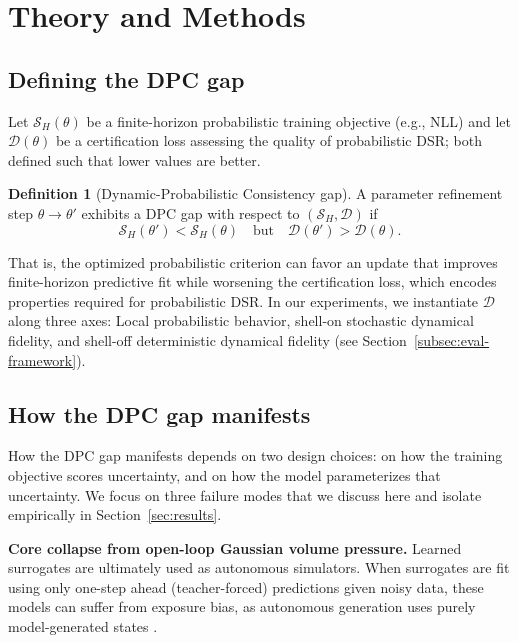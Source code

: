 \documentclass{article}
\theoremstyle{plain}
\theoremstyle{definition}
\newtheorem{definition}{Definition}
\theoremstyle{remark}
\begin{document}
\section{Theory and Methods}
\label{sec:theory_methods}

\subsection{Defining the DPC gap}
\label{subsec:dpc_gap}
Let $\mathcal S_H(\theta)$ be a finite-horizon probabilistic training objective (e.g., NLL) and let $\mathcal D(\theta)$ be a certification loss assessing the quality of probabilistic DSR; both defined such that lower values are better.
\begin{definition}[Dynamic-Probabilistic Consistency gap]
A parameter refinement step $\theta \to \theta'$ exhibits a DPC gap with respect to $(\mathcal S_H,\mathcal D)$ if
\[
\mathcal S_H(\theta') < \mathcal S_H(\theta)
\quad\text{but}\quad
\mathcal D(\theta') > \mathcal D(\theta).
\]
\end{definition}

That is, the optimized probabilistic criterion can favor an update that improves finite-horizon predictive fit while worsening the certification loss, which encodes properties required for probabilistic DSR. In our experiments, we instantiate $\mathcal D$ along three axes: Local probabilistic behavior, shell-on stochastic dynamical fidelity, and shell-off deterministic dynamical fidelity (see Section~\ref{subsec:eval-framework}).

\subsection{How the DPC gap manifests}
\label{subsec:dpc_mechanisms}
How the DPC gap manifests depends on two design choices: on how the training objective scores uncertainty, and on how the model parameterizes that uncertainty. We focus on three failure modes that we discuss here and isolate empirically in Section~\ref{sec:results}.

\textbf{Core collapse from open-loop Gaussian volume pressure.}
Learned surrogates are ultimately used as autonomous simulators. When surrogates are fit using only one-step ahead (teacher-forced) predictions given noisy data, these models can suffer from exposure bias, as autonomous generation uses purely model-generated states \citep{doya1992bifurcations,levine2022framework,bengio2015scheduled,ranzato2016sequence}.
\end{document}
